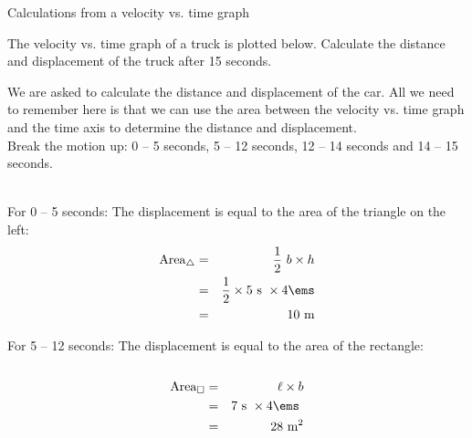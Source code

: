 \begin{wex}{Calculations from a velocity vs. time graph}
{The velocity vs. time graph of a truck is plotted below. Calculate the distance and displacement of the truck after 15 seconds.
\begin{center}
\end{center}}
{
We are asked to calculate the distance and displacement of the car. All we need to remember here is that we can use the area between the velocity vs. time graph and the time axis to determine the distance and displacement.\\
Break the motion up: 0 -- 5 seconds, 5 -- 12 seconds, 12 -- 14 seconds and 14 -- 15 seconds.\\
\\
\begin{minipage}{0.4\textwidth}
For 0 -- 5 seconds: The displacement is equal to the area of the triangle on the left:
\begin{eqnarray*}
\text{Area}_{\triangle} &=& \frac{1}{2}~b \times h\\
&=& \frac{1}{2} \times 5\text{~s}\ \times 4 \ems  \\
&=&10\ \text{m}\\
\end{eqnarray*}
\end{minipage}
\begin{minipage}{0.05\textwidth}
\begin{center}
\end{center}
\end{minipage}
\begin{minipage}{0.4\textwidth}
For 5 -- 12 seconds: The displacement is equal to the area of the rectangle:\\
\\
\begin{eqnarray*}
\text{Area}_{\Box} &=& \ell \times b\\
&=&7\text{~s}\ \times 4 \ems\ \\
&=&28\ \text{m}^2\\
\end{eqnarray*}
\end{minipage}

}
\end{wex}
